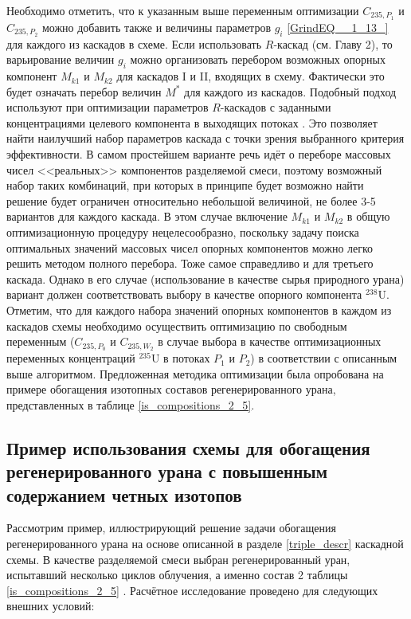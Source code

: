 {Необходимо отметить, что к указанным выше переменным оптимизации $C_{235,{P_1}}$ и $C_{235,{P_2}}$ можно добавить также и величины параметров $g_{i}$  \ref{GrindEQ__1_13_} для каждого из каскадов в схеме. Если использовать $R$-каскад (см. Главу 2), то варьирование величин $g_{i}$ можно организовать перебором возможных опорных компонент $M_{k1}$ и $M_{k2}$ для каскадов I и II, входящих в схему. Фактически это будет означать перебор величин $M^{*}$ для каждого из каскадов. Подобный подход используют при оптимизации параметров $R$-каскадов с заданными концентрациями целевого компонента в выходящих потоках \cite{songComparativeStudyModel2010, sulaberidzeSravnenieOptimalnyhModelnyh2008}. Это позволяет найти наилучший набор параметров каскада с точки зрения выбранного критерия эффективности. В самом простейшем варианте речь идёт о переборе массовых чисел <<реальных>> компонентов разделяемой смеси, поэтому возможный набор таких комбинаций, при которых в принципе будет возможно найти решение будет ограничен относительно небольшой величиной, не более 3-5 вариантов для каждого каскада. В этом случае включение $M_{k1}$ и $M_{k2}$ в общую оптимизационную процедуру нецелесообразно, поскольку задачу поиска оптимальных значений массовых чисел опорных компонентов можно легко решить методом полного перебора. Тоже самое справедливо и для третьего каскада.
Однако в его случае (использование в качестве сырья природного урана) вариант должен соответствовать выбору в качестве опорного компонента $^{238}$U. Отметим, что для каждого набора значений опорных компонентов в каждом из каскадов схемы необходимо осуществить оптимизацию по свободным переменным ($C_{235,P_0}$ и $C_{235,W_2}$ в случае выбора в качестве оптимизационных переменных концентраций $^{235}$U в потоках $P_1$ и $P_2$) в соответствии с описанным выше алгоритмом. 
Предложенная методика оптимизации была опробована на примере обогащения изотопных составов регенерированного урана, представленных в таблице \ref{is_compositions_2_5}.

\subsection{Пример использования схемы для обогащения регенерированного урана с повышенным содержанием четных изотопов}\label{example_trip}

Рассмотрим пример, иллюстрирующий решение задачи обогащения регенерированного урана на основе описанной в разделе \ref{triple_descr} каскадной схемы. В качестве разделяемой смеси выбран регенерированный уран, испытавший несколько циклов облучения, а именно состав 2 таблицы \ref{is_compositions_2_5} \cite{smirnovObogashchenieRegenerirovannogoUrana2018}. Расчётное исследование проведено для следующих внешних условий:

}
